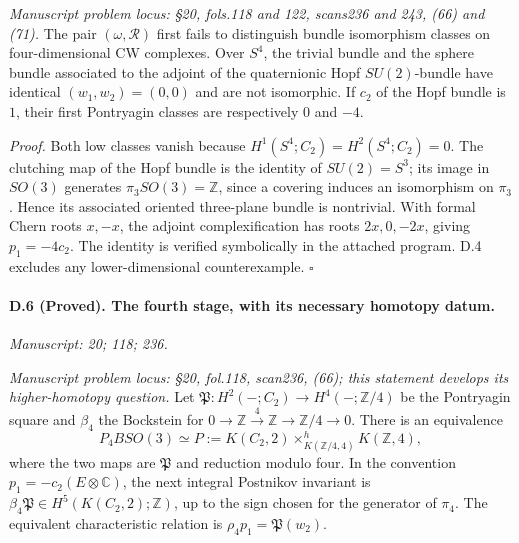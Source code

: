 \emph{Manuscript problem locus: \S20, fols.118 and 122, scans236 and 243, (66) and (71).}
The pair $(\omega,\mathcal R)$ first fails to distinguish bundle isomorphism classes on four-dimensional CW complexes. Over $S^4$, the trivial bundle and the sphere bundle associated to the adjoint of the quaternionic Hopf $SU(2)$-bundle have identical $(w_1,w_2)=(0,0)$ and are not isomorphic. If $c_2$ of the Hopf bundle is $1$, their first Pontryagin classes are respectively $0$ and $-4$.

\emph{Proof.} Both low classes vanish because $H^1(S^4;C_2)=H^2(S^4;C_2)=0$. The clutching map of the Hopf bundle is the identity of $SU(2)=S^3$; its image in $SO(3)$ generates $\pi_3SO(3)=\mathbb Z$, since a covering induces an isomorphism on $\pi_3$. Hence its associated oriented three-plane bundle is nontrivial. With formal Chern roots $x,-x$, the adjoint complexification has roots $2x,0,-2x$, giving $p_1=-4c_2$. The identity is verified symbolically in the attached program. D.4 excludes any lower-dimensional counterexample. \hfill$\square$

\paragraph{D.6 (Proved). The fourth stage, with its necessary homotopy datum.}
\textit{Manuscript: 20; 118; 236.}

\emph{Manuscript problem locus: \S20, fol.118, scan236, (66); this statement develops its higher-homotopy question.}
Let $\mathfrak P:H^2(-;C_2)\to H^4(-;\mathbb Z/4)$ be the Pontryagin square and $\beta_4$ the Bockstein for $0\to\mathbb Z\xrightarrow4\mathbb Z\to\mathbb Z/4\to0$. There is an equivalence
\[
P_4BSO(3)\simeq P:=
K(C_2,2)\mathop{\times}^{h}_{K(\mathbb Z/4,4)}K(\mathbb Z,4),
\]
where the two maps are $\mathfrak P$ and reduction modulo four. In the convention $p_1=-c_2(E\otimes\mathbb C)$, the next integral Postnikov invariant is $\beta_4\mathfrak P\in H^5(K(C_2,2);\mathbb Z)$, up to the sign chosen for the generator of $\pi_4$. The equivalent characteristic relation is
$\rho_4p_1=\mathfrak P(w_2)$.


